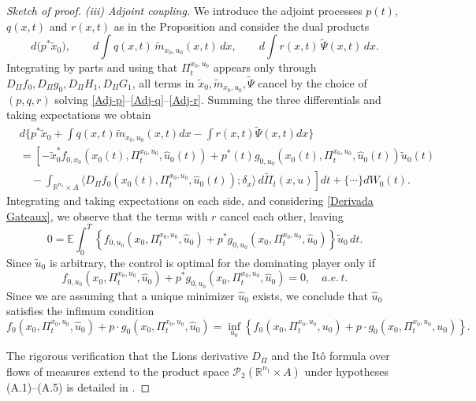 \documentclass[12pt]{article}
\theoremstyle{definition}
\begin{document}
\begin{proof}[Sketch of proof]
\emph{(iii) Adjoint coupling.} We introduce the adjoint processes $p(t)$, $q(x,t)$ and $r(x,t)$ as in the Proposition and consider the dual products
\[
d\big(p^* \tilde x_0\big),\qquad d\!\int q(x,t)\,\tilde m_{x_0,u_0}(x,t)\,dx,\qquad d\!\int r(x,t)\,\tilde\Psi(x,t)\,dx.
\]
Integrating by parts and using that $\Pi^{x_0,u_0}_t$ appears only through $D_\Pi f_0, D_\Pi g_0, D_\Pi H_1, D_\Pi G_1$, all terms in $\tilde x_0, \tilde m_{x_0,u_0}, \tilde\Psi$ cancel by the choice of $(p,q,r)$ solving \eqref{Adj-p}--\eqref{Adj-q}--\eqref{Adj-r}. Summing the three differentials and taking expectations we obtain
\begin{align*}
    & d\{p^*\tilde{x}_0+\int q(x,t)\tilde{m}_{x_0,u_0}(x,t)dx-\int r(x,t)\tilde{\Psi}(x,t)dx\} \\
    &= \left[-\tilde{x}_0^* f_{0,x_0}(x_0(t), \Pi^{x_0,u_0}_t, \hat{u}_0(t))+p^*(t)g_{0,u_0}(x_0(t), \Pi^{x_0,u_0}_t, \hat{u}_0(t)) \tilde{u}_0(t) \right.\\
    &\quad - \left.\int_{\mathbb{R}^{n_1}\times A} \Big\langle D_\Pi f_0(x_0(t),\Pi^{x_0,u_0}_t,\hat{u}_0(t));\delta_x\Big\rangle\,d\tilde\Pi_t(x,u)\right]dt+\{\cdots\}dW_0(t).
\end{align*}
Integrating and taking expectations on each side, and considering \eqref{Derivada Gateaux}, we observe that the terms with $r$ cancel each other, leaving
$$0=\mathbb{E}\int_0^T\left\{f_{0,u_0}(x_0,\Pi^{x_0,u_0}_t,\hat{u}_0)+p^*g_{0,u_0}(x_0,\Pi^{x_0,u_0}_t,\hat{u}_0)\right\}\tilde{u}_0\,dt.$$
Since $\tilde{u}_0$ is arbitrary, the control is optimal for the dominating player only if
$$f_{0,u_0}(x_0,\Pi^{x_0,u_0}_t,\hat{u}_0)+p^*g_{0,u_0}(x_0,\Pi^{x_0,u_0}_t,\hat{u}_0)=0,\quad a.e.\,t.$$
Since we are assuming that a unique minimizer $\hat{u}_0$ exists, we conclude that $\hat{u}_0$ satisfies the infimum condition
$$f_0(x_0,\Pi^{x_0,u_0}_t,\hat{u}_0)+p\cdot g_0(x_0,\Pi^{x_0,u_0}_t,\hat{u}_0)=\inf_{u_0}\left\{f_0(x_0,\Pi^{x_0,u_0}_t,u_0)+p\cdot g_0(x_0,\Pi^{x_0,u_0}_t,u_0)\right\}.$$

The rigorous verification that the Lions derivative $D_\Pi$ and the It\^{o} formula over flows of measures extend to the product space $\mathcal{P}_2(\mathbb{R}^{n_1} \times A)$ under hypotheses (A.1)--(A.5) is detailed in \cite{munoz2025complexmarkets}.
\end{proof}
\end{document}
